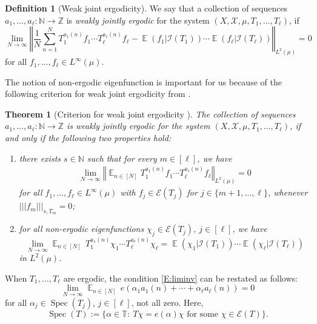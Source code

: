 \documentclass[11pt]{amsart}
\newtheorem{theorem}[lemma]{Theorem}
\theoremstyle{definition}
\newtheorem*{definition}{Definition}
\newcommand{\N}{{\mathbb N}}
\newcommand{\T}{{\mathbb T}}
\newcommand{\Z}{{\mathbb Z}}
\newcommand{\CE}{{\mathcal E}}
\newcommand{\CI}{{\mathcal I}}
\newcommand{\CX}{{\mathcal X}}
\newcommand{\norm}[1]{\left\Vert #1\right\Vert}
\newcommand{\nnorm}[1]{\lvert\!|\!| #1|\!|\!\rvert}
\DeclareMathOperator*{\E}{\mathbb{E}}
\DeclareMathOperator{\Spec}{Spec}
\begin{document}
\begin{definition}[Weak joint ergodicity]        We say that  a collection of sequences  $a_1, \ldots, a_\ell\colon \N\to\Z$ is {\em weakly jointly ergodic} for the system  $(X, \CX, \mu, T_1, \ldots, T_\ell)$, if  $$
        		\lim_{N\to\infty}\norm{\frac{1}{N}\sum_{n=1}^N T_1^{a_1(n)}f_1 \cdots T_\ell^{a_\ell(n)}f_\ell -
        			\E(f_1|\CI(T_1)) \cdots \E(f_\ell|\CI(T_\ell))}_{L^2(\mu)} = 0
        $$
        for all $f_1, \ldots, f_\ell\in L^\infty(\mu)$.
        \end{definition}
        The notion of non-ergodic eigenfunction is important for us because of the following criterion for weak joint ergodicity from \cite{FrKu22}.
					\begin{theorem}[Criterion for weak joint ergodicity {\cite[Theorem 2.5]{FrKu22}}]\label{T: criteria for joint ergodicity}
				The collection of  sequences  $a_1, \ldots, a_\ell\colon \N\to\Z$ is weakly jointly ergodic for the system  $(X, \CX, \mu, T_1, \ldots, T_\ell)$,     if and only if the following two properties hold:
					\begin{enumerate}
						\item \label{i:11} there exists $s\in\N$ such that for every $m\in[\ell]$, we have
						\begin{align*}
						    \lim_{N\to\infty}\norm{\E_{n\in[N]}T_1^{a_1(n)}f_1\cdots T_\ell^{a_\ell(n)}f_\ell}_{L^2(\mu)} = 0
						\end{align*}
						for all $f_1, \ldots, f_\ell\in L^\infty(\mu)$ with $f_j\in\CE(T_j)$ for $j\in\{m+1, \ldots, \ell\}$, whenever $\nnorm{f_m}_{s, T_m} = 0$;
						
						\item \label{i:12} for all non-ergodic eigenfunctions $\chi_j\in\CE(T_j)$, $j\in[\ell]$, we have
						\begin{equation}\label{E:liminv}
						\lim_{N\to\infty}\E_{n\in[N]} \,  T_1^{a_1(n)}\chi_1\cdots T_\ell^{a_\ell(n)}\chi_\ell =\E(\chi_1|\CI(T_1))\cdots \E(\chi_\ell|\CI(T_\ell))
						\end{equation}
						in $L^2(\mu)$.
					\end{enumerate}
				\end{theorem}
				When $T_1, \ldots, T_\ell$ are ergodic, the condition \eqref{E:liminv} can be restated as follows:
					\begin{equation*}%
						\lim_{N\to\infty}\E_{n\in[N]} \,  e(\alpha_1 a_1(n) + \cdots + \alpha_\ell a_\ell(n)) = 0
					\end{equation*}
					for all $\alpha_j\in\Spec(T_j)$, $j\in[\ell]$, not all zero. Here,
					$$\Spec(T) := \{\alpha\in\T:\ T\chi = e(\alpha) \chi \textrm{ for some } \chi\in\CE(T)\}.$$
				
\end{document}
